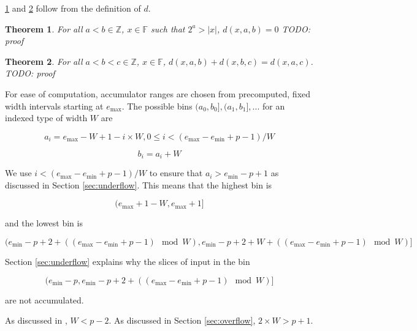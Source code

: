 \documentclass[12pt]{article}
\providecommand{\F}{\ensuremath{\mathbb{F}}}
\providecommand{\Z}{\ensuremath{\mathbb{Z}}}
\providecommand{\min}{\ensuremath{\text{min}}}
\providecommand{\max}{\ensuremath{\text{max}}}
\theoremstyle{plain}
\newtheorem{thm}{Theorem}[section]
\begin{document}
    \ref{thm:dzero} and \ref{thm:dtransitive} follow from the definition of $d$.

    \begin{thm}
      For all $a < b \in \Z$, $x \in \F$ such that $2^a > |x|$, $d(x, a, b) = 0$
      \label{thm:dzero}
      TODO: proof
    \end{thm}

    \begin{thm}
      For all $a < b < c \in \Z$, $x \in \F$, $d(x, a, b) + d(x, b, c) = d(x, a, c)$.
      TODO: proof
      \label{thm:dtransitive}
    \end{thm}

    For ease of computation, accumulator ranges are chosen from precomputed, fixed width intervals starting at $e_{\max}$. The possible bins $(a_0, b_0], (a_1, b_1], ...$ for an indexed type of width $W$ are

    \begin{equation*}
      a_i = e_{\max} - W + 1 - i\times W, 0 \leq i < (e_{\max} - e_{\min} + p - 1)/W
    \end{equation*}

    \begin{equation*}
      b_i = a_i + W
    \end{equation*}

    We use $i < (e_{\max} - e_{\min} + p - 1)/W$ to ensure that $a_i > e_{\min} - p + 1$ as discussed in Section \ref{sec:underflow}. This means that the highest bin is

    \begin{equation*}
    (e_{\max} + 1 - W, e_{\max} + 1]
    \end{equation*}

    and the lowest bin is

    \begin{equation*}
    (e_{\min} - p + 2 + ((e_{\max} - e_{\min} + p - 1)\mod W),
    e_{\min} - p + 2 + W + ((e_{\max} - e_{\min} + p - 1)\mod W)]
    \end{equation*}

    Section \ref{sec:underflow} explains why the slices of input in the bin

    \begin{equation*}
    (e_{\min} - p, e_{\min} - p + 2 + ((e_{\max} - e_{\min} + p - 1) \mod W)]
    \end{equation*}

    are not accumulated.

    As discussed in \cite{repsum}, $W < p - 2$. As discussed in Section \ref{sec:overflow}, $2\times W > p + 1$.
\end{document}
